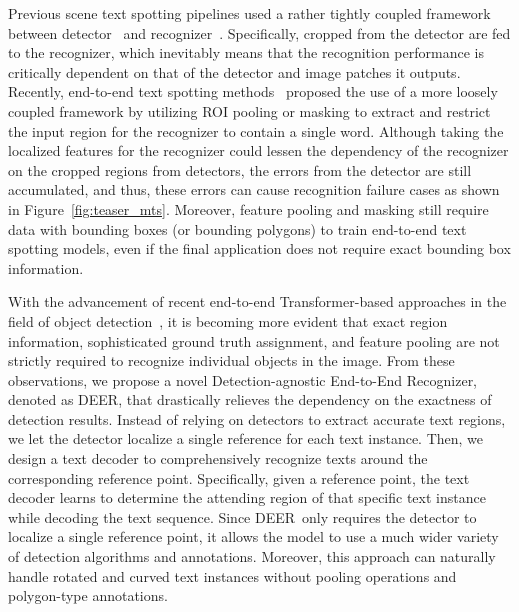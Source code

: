 \documentclass[10pt,twocolumn,letterpaper]{article}
\newcommand{\Figure}[1]{Figure~\ref{fig:#1}}
\newcommand{\methodname}[0]{DEER}
\begin{document}
Previous scene text spotting pipelines used a rather tightly coupled framework between detector~\cite{CUTE80,liao2018textboxes++,baek2019character,liao2020real} and recognizer~\cite{Jaderberg16mjsynth,shi2016robust,FAN,CRNN,AON,ASTER,ESIR}. Specifically, cropped  from the detector are fed to the recognizer, which inevitably means that the recognition performance is critically dependent on that of the detector and image patches it outputs. 
Recently, end-to-end text spotting methods~\cite{liu2018fots,baek2020character,liao2020mask,liu2020abcnet} proposed the use of a more loosely coupled framework by utilizing ROI pooling or masking to extract  and restrict the input region for the recognizer to contain a single word.
Although taking the localized features for the recognizer could lessen the dependency of the recognizer on the cropped regions from detectors, the errors from the detector are still accumulated, and thus, these errors can cause recognition failure cases as shown in \Figure{teaser_mts}. 
Moreover, feature pooling and masking still require data with bounding boxes (or bounding polygons) to train end-to-end text spotting models, even if the final application does not require exact bounding box information.


With the advancement of recent end-to-end Transformer-based approaches in the field of object detection~\cite{carion2020end,zhu2021deformable,yao2021efficient,chen2021pix2seq}, it is becoming more evident that exact region information, sophisticated ground truth assignment, and feature pooling are not strictly required to recognize individual objects in the image.
From these observations, we propose a novel Detection-agnostic End-to-End Recognizer, denoted as \methodname, that drastically relieves the dependency on the exactness of detection results. 
Instead of relying on detectors to extract accurate text regions, we let the detector localize a single reference  for each text instance. Then, we design a text decoder to comprehensively recognize texts around the corresponding reference point. 
Specifically, given a reference point, the text decoder learns to determine the attending region of that specific text instance while decoding the text sequence.  
Since \methodname~only requires the detector to localize a single reference point, it allows the model to use a much wider variety of detection algorithms and annotations. Moreover, this approach can naturally handle rotated and curved text instances without pooling operations and polygon-type annotations.
\end{document}
